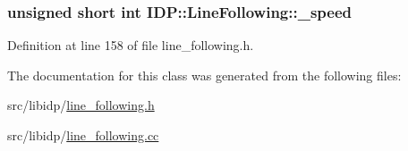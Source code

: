 \hypertarget{classIDP_1_1LineFollowing_a67d4ac53d4cd8fa53d6b61ec839ce8bc}{
\subsubsection[{\_\-speed}]{\setlength{\rightskip}{0pt plus 5cm}unsigned short int {\bf IDP::LineFollowing::\_\-speed}}}
\label{classIDP_1_1LineFollowing_a67d4ac53d4cd8fa53d6b61ec839ce8bc}


Definition at line 158 of file line\_\-following.h.



The documentation for this class was generated from the following files:\begin{DoxyCompactItemize}
\item 
src/libidp/\hyperlink{line__following_8h}{line\_\-following.h}\item 
src/libidp/\hyperlink{line__following_8cc}{line\_\-following.cc}\end{DoxyCompactItemize}
